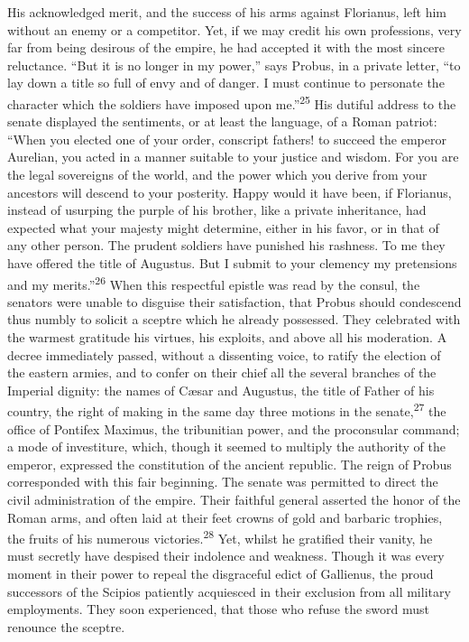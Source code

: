 His acknowledged merit, and the success of his arms against
Florianus, left him without an enemy or a competitor. Yet, if we
may credit his own professions, very far from being desirous of
the empire, he had accepted it with the most sincere reluctance.
“But it is no longer in my power,” says Probus, in a private
letter, “to lay down a title so full of envy and of danger. I
must continue to personate the character which the soldiers have
imposed upon me.”\textsuperscript{25} His dutiful address to the senate displayed
the sentiments, or at least the language, of a Roman patriot:
“When you elected one of your order, conscript fathers! to
succeed the emperor Aurelian, you acted in a manner suitable to
your justice and wisdom. For you are the legal sovereigns of the
world, and the power which you derive from your ancestors will
descend to your posterity. Happy would it have been, if
Florianus, instead of usurping the purple of his brother, like a
private inheritance, had expected what your majesty might
determine, either in his favor, or in that of any other person.
The prudent soldiers have punished his rashness. To me they have
offered the title of Augustus. But I submit to your clemency my
pretensions and my merits.”\textsuperscript{26} When this respectful epistle was
read by the consul, the senators were unable to disguise their
satisfaction, that Probus should condescend thus numbly to
solicit a sceptre which he already possessed. They celebrated
with the warmest gratitude his virtues, his exploits, and above
all his moderation. A decree immediately passed, without a
dissenting voice, to ratify the election of the eastern armies,
and to confer on their chief all the several branches of the
Imperial dignity: the names of Cæsar and Augustus, the title of
Father of his country, the right of making in the same day three
motions in the senate,\textsuperscript{27} the office of Pontifex Maximus, the
tribunitian power, and the proconsular command; a mode of
investiture, which, though it seemed to multiply the authority of
the emperor, expressed the constitution of the ancient republic.
The reign of Probus corresponded with this fair beginning. The
senate was permitted to direct the civil administration of the
empire. Their faithful general asserted the honor of the Roman
arms, and often laid at their feet crowns of gold and barbaric
trophies, the fruits of his numerous victories.\textsuperscript{28} Yet, whilst he
gratified their vanity, he must secretly have despised their
indolence and weakness. Though it was every moment in their power
to repeal the disgraceful edict of Gallienus, the proud
successors of the Scipios patiently acquiesced in their exclusion
from all military employments. They soon experienced, that those
who refuse the sword must renounce the sceptre.

